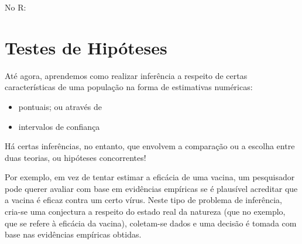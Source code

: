 \documentclass[
]{book}
\newenvironment{Shaded}{\begin{snugshade}}{\end{snugshade}}
\newcommand{\CommentTok}[1]{\textcolor[rgb]{0.56,0.35,0.01}{\textit{#1}}}
\newcommand{\DataTypeTok}[1]{\textcolor[rgb]{0.13,0.29,0.53}{#1}}
\newcommand{\DecValTok}[1]{\textcolor[rgb]{0.00,0.00,0.81}{#1}}
\newcommand{\FloatTok}[1]{\textcolor[rgb]{0.00,0.00,0.81}{#1}}
\newcommand{\KeywordTok}[1]{\textcolor[rgb]{0.13,0.29,0.53}{\textbf{#1}}}
\newcommand{\NormalTok}[1]{#1}
\newcommand{\OperatorTok}[1]{\textcolor[rgb]{0.81,0.36,0.00}{\textbf{#1}}}
\newcommand{\StringTok}[1]{\textcolor[rgb]{0.31,0.60,0.02}{#1}}
\providecommand{\tightlist}{%
  \setlength{\itemsep}{0pt}\setlength{\parskip}{0pt}}
\theoremstyle{definition}
\theoremstyle{definition}
\theoremstyle{definition}
\theoremstyle{remark}
\begin{document}
No R:

\begin{Shaded}
\end{Shaded}

\hypertarget{testes-de-hipuxf3teses}{%
\chapter{Testes de Hipóteses}\label{testes-de-hipuxf3teses}}

Até agora, aprendemos como realizar inferência a respeito de certas características
de uma população na forma de estimativas numéricas:

\begin{itemize}
\tightlist
\item
  pontuais; ou através de\\
\item
  intervalos de confiança
\end{itemize}

Há certas inferências, no entanto, que envolvem a comparação ou a escolha entre
duas teorias, ou hipóteses concorrentes!

Por exemplo, em vez de tentar estimar a eficácia de uma vacina, um pesquisador pode querer avaliar com base em evidências empíricas se é plausível acreditar que a vacina é eficaz contra um certo vírus. Neste tipo de problema de inferência, cria-se uma conjectura a respeito do estado real da natureza (que no exemplo, que se refere à eficácia da vacina), coletam-se dados e uma decisão é tomada com base nas evidências empíricas obtidas.
\end{document}

